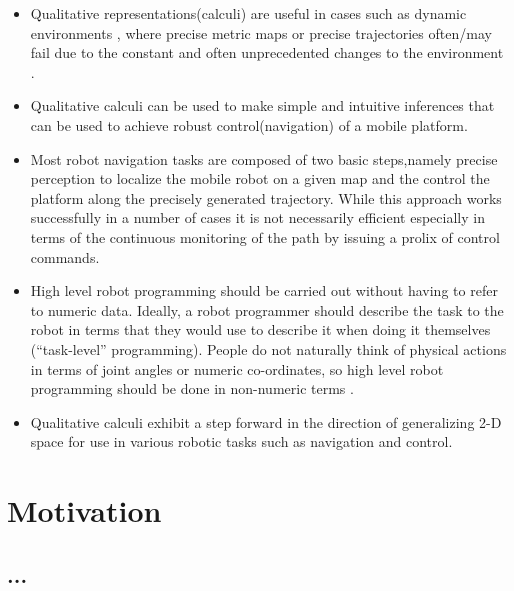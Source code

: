 \begin{itemize}   
	
	\item Qualitative representations(calculi) are useful in cases such as dynamic environments \cite{fraser2004application}, where precise metric maps or precise trajectories often/may fail due to the constant and often unprecedented changes to the environment \cite{shah2013qualitative}.
	
	\item Qualitative calculi can be used to make simple and intuitive inferences that can be used to achieve robust control(navigation) \cite{cohn2008qualitative} \cite{kuipers1991robot} of a mobile platform.
	
	\newpage
	
	\item Most robot navigation tasks are composed of two basic steps,namely precise perception to localize the mobile robot on a given map and the control the platform along the precisely generated trajectory. While this approach works successfully in a number of cases it is not necessarily efficient \cite{mcclelland2016qualitative} especially in terms of the continuous monitoring of the path by issuing a prolix of control commands.
	
	\item High level robot programming should be carried out without having to refer to numeric data. Ideally, a robot programmer should describe the task to the robot in terms that they would use to describe it when doing it themselves (``task-level'' programming). People do not naturally think of physical actions in terms of joint angles or numeric co-ordinates, so high level robot programming should be done in non-numeric terms \cite{blackwell1988spatial}.
	
	\item Qualitative calculi exhibit a step forward in the direction of generalizing 2-D space \cite{blackwell1988spatial} for use in various robotic tasks such as navigation \cite{mcclelland2016qualitative} \cite{cohn2008qualitative} and control.
\end{itemize}


\section{Motivation}
\subsection{...}



